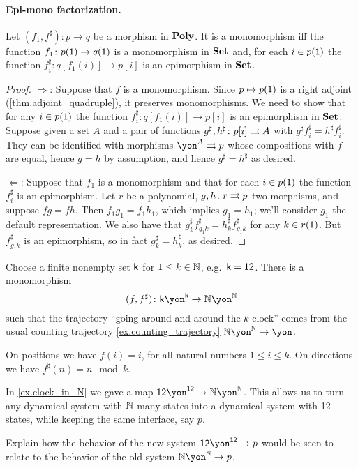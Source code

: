 \documentclass[Book-Poly]{subfiles}
\begin{document}
\paragraph{Epi-mono factorization.}

\begin{proposition}\label{prop.monics_in_poly}
Let $(f_1,f^\sharp)\colon p\to q$ be a morphism in $\mathbf{Poly}$. It is a monomorphism iff the function $f_1\colon p(\textsf{1})\to q(\textsf{1})$ is a monomorphism in $\mathbf{Set}$ and, for each $i\in p(\textsf{1})$ the function $f_i^\sharp\colon q[f_1(i)]\to p[i]$ is an epimorphism in $\mathbf{Set}$.
\end{proposition}
\begin{proof}
\noindent$\Rightarrow$: Suppose that $f$ is a monomorphism. Since $p\mapsto p(\textsf{1})$ is a right adjoint (\cref{thm.adjoint_quadruple}), it preserves monomorphisms. We need to show that for any $i\in p(\textsf{1})$ the function $f_i^\sharp\colon q[f_1(i)]\to p[i]$ is an epimorphism in $\mathbf{Set}$. Suppose given a set $A$ and a pair of functions $g^\sharp,h^\sharp\colon p[i]\rightrightarrows A$ with $g^\sharp f_i^\sharp=h^\sharp f_i^\sharp$. They can be identified with morphisms $\yon^A\tto p$ whose compositions with $f$ are equal, hence $g=h$ by assumption, and hence $g^\sharp=h^\sharp$ as desired.

\noindent$\Leftarrow$: Suppose that $f_1$ is a monomorphism and that for each $i\in p(\textsf{1})$ the function $f_i^\sharp$ is an epimorphism. Let $r$ be a polynomial, $g,h\colon r\rightrightarrows p$ two morphisms, and suppose $fg=fh$. Then $f_1g_1=f_1h_1$, which implies $g_1=h_1$; we'll consider $g_1$ the default representation. We also have that $g^\sharp_kf^\sharp_{g_1k}=h^\sharp_kf^\sharp_{g_1k}$ for any $k\in r(\textsf{1})$. But $f^\sharp_{g_1k}$ is an epimorphism, so in fact $g^\sharp_k=h^\sharp_k$, as desired.
\end{proof}

\begin{example}\label{ex.clock_in_N}
Choose a finite nonempty set $\mathsf{k}$ for $1\leq k\in\mathbb{N}$, e.g.\ $\mathsf{k}=\textsf{1}\textsf{2}$. There is a monomorphism
\[
(f,f^\sharp)\colon\ord{k}\yon^{\ord{k}}\to\nn\yon^\nn
\]
such that the trajectory ``going around and around the $k$-clock'' comes from the usual counting trajectory \cref{ex.counting_trajectory} $\nn\yon^\nn\to\yon$.

On positions we have $f(i)=i$, for all natural numbers $1\leq i\leq k$. On directions we have $f^\sharp(n)=n\mod k$.
\end{example}

\begin{exercise}
In \cref{ex.clock_in_N} we gave a map $\1\2\yon^{\1\2}\to\nn\yon^\nn$. This allows us to turn any dynamical system with $\mathbb{N}$-many states into a dynamical system with 12 states, while keeping the same interface, say $p$. 

Explain how the behavior of the new system $\1\2\yon^{\1\2}\to p$ would be seen to relate to the behavior of the old system $\nn\yon^\nn\to p$.
\end{exercise}
\end{document}
